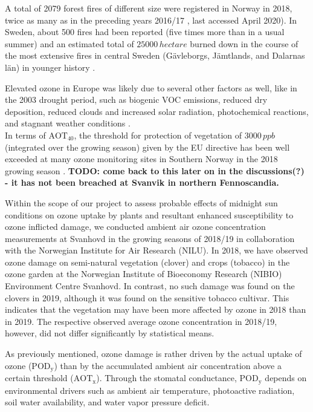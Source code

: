 \documentclass[bg, manuscript]{copernicus}
\begin{document}
A total of 2079 forest fires of different size were registered in Norway in 2018, twice as many as in the preceding years 2016/17 \citep{DSB2019}, last accessed April 2020). In Sweden, about 500 fires had been reported (five times more than in a usual summer) and an estimated total of $25000\,\unit{hectare}$ burned down in the course of the most extensive fires in central Sweden (G\"{a}vleborgs, J\"{a}mtlands, and Dalarnas l\"{a}n) in younger history \citep{SOU2019}.

Elevated ozone in Europe was likely due to several other factors as well, like in the 2003 drought period, such as biogenic VOC emissions, reduced dry deposition, reduced clouds and increased solar radiation, photochemical reactions, and stagnant weather conditions \citep{JGR:Solberg2018}.\\

In terms of $\mathrm{AOT_{40}}$, the threshold for protection of vegetation of $3000\,\unit{ppb}$ (integrated over the growing season) given by the EU directive has been well exceeded at many ozone monitoring sites in Southern Norway in the 2018 growing season \citep{NILU2019}. {\bf TODO: come back to this later on in the discussions(?) - it has not been breached at Svanvik in northern Fennoscandia.}

Within the scope of our project to assess probable effects of midnight sun conditions on ozone uptake by plants and resultant enhanced susceptibility to ozone inflicted damage, we conducted ambient air ozone concentration measurements at Svanhovd in the growing seasons of 2018/19 in collaboration with the Norwegian Institute for Air Research (NILU). 
In 2018, we have observed ozone damage on semi-natural vegetation (clover) and crops (tobacco) in the ozone garden at the Norwegian Institute of Bioeconomy Research (NIBIO) Environment Centre Svanhovd. In contrast, no such damage was found on the clovers in 2019, although it was found on the sensitive tobacco cultivar. This indicates that the vegetation may have been more affected by ozone in 2018 than in 2019.
The respective observed average ozone concentration in 2018/19, however, did not differ significantly by statistical means.

As previously mentioned, ozone damage is rather driven by the actual uptake of ozone ($\mathrm{POD_y}$) than by the accumulated ambient air concentration above a certain threshold ($\mathrm{AOT_x}$). Through the stomatal conductance, $\mathrm{POD_y}$ depends on environmental drivers such as ambient air temperature, photoactive radiation, soil water availability, and water vapor pressure deficit.
\end{document}
